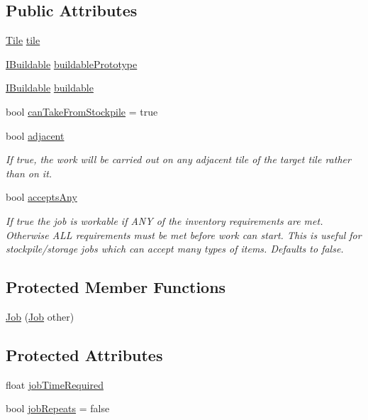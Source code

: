 \subsection*{Public Attributes}
\begin{DoxyCompactItemize}
\item 
\hyperlink{class_tile}{Tile} \hyperlink{class_job_a36c037d122ff255572942f7d3c949bbd}{tile}
\item 
\hyperlink{interface_i_buildable}{I\+Buildable} \hyperlink{class_job_a53afb8d21780b4252d6aa12d97765d00}{buildable\+Prototype}
\item 
\hyperlink{interface_i_buildable}{I\+Buildable} \hyperlink{class_job_a59502e5a19ee4d1ff89eb97c933b6f8e}{buildable}
\item 
bool \hyperlink{class_job_aa7e8528a15ee13d00ef61f9dfb116f63}{can\+Take\+From\+Stockpile} = true
\item 
bool \hyperlink{class_job_a68dea057c25e34f4d55cb70e913991a8}{adjacent}
\begin{DoxyCompactList}\small\item\em If true, the work will be carried out on any adjacent tile of the target tile rather than on it. \end{DoxyCompactList}\item 
bool \hyperlink{class_job_a92c1d5af0a58eb2c34cba2be7b4e3f97}{accepts\+Any}
\begin{DoxyCompactList}\small\item\em If true the job is workable if A\+NY of the inventory requirements are met. Otherwise A\+LL requirements must be met before work can start. This is useful for stockpile/storage jobs which can accept many types of items. Defaults to false. \end{DoxyCompactList}\end{DoxyCompactItemize}
\subsection*{Protected Member Functions}
\begin{DoxyCompactItemize}
\item 
\hyperlink{class_job_a733d72f027e5594644fe0cfc0774dcd1}{Job} (\hyperlink{class_job}{Job} other)
\end{DoxyCompactItemize}
\subsection*{Protected Attributes}
\begin{DoxyCompactItemize}
\item 
float \hyperlink{class_job_a23e934caf9fd211ccc29ae1a8eeb99be}{job\+Time\+Required}
\item 
bool \hyperlink{class_job_a6987ac66f301cfb576dac72451328b39}{job\+Repeats} = false
\end{DoxyCompactItemize}
